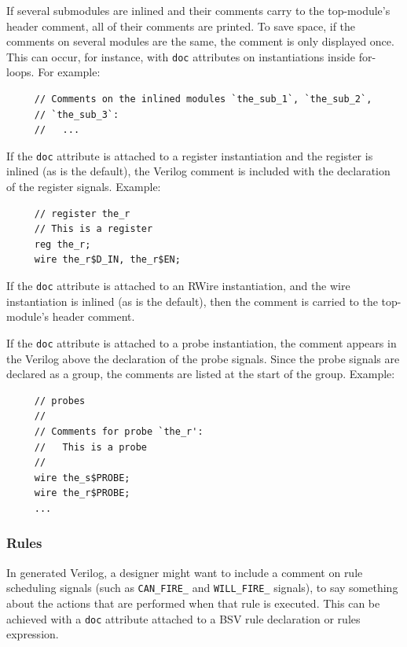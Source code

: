\documentclass[twoside,letterpaper]{article}
\newcommand{\te}[1]{\texttt{#1}}
\begin{document}
If several submodules are inlined and their comments
carry to the top-module's header comment, all of their comments are
printed.  To save space, if the comments on several modules are the same,
the comment is only displayed once.  This can occur, for instance, with
\te{doc} attributes on instantiations inside for-loops.  For example:
\begin{verbatim}
     // Comments on the inlined modules `the_sub_1`, `the_sub_2`,
     // `the_sub_3`:
     //   ...
\end{verbatim}
If the \te{doc} attribute is attached to a register instantiation and
the register is inlined (as is the default), the
Verilog comment is included with the declaration of the register signals.  Example: 
\begin{verbatim}
     // register the_r
     // This is a register
     reg the_r;
     wire the_r$D_IN, the_r$EN;
\end{verbatim}
If the \te{doc} attribute is attached to an RWire instantiation, and
the wire instantiation is inlined (as is the default), then the comment
is carried to the top-module's header comment.

If the \te{doc} attribute is attached to a probe instantiation, the comment
appears in the Verilog above the declaration of the probe signals.  Since
the probe signals are declared as a group, the comments are listed at
the start of the group. Example:
\begin{verbatim}
     // probes
     //
     // Comments for probe `the_r':
     //   This is a probe
     //
     wire the_s$PROBE;
     wire the_r$PROBE;
     ...
\end{verbatim}


\subsubsection{Rules}
\label{comments-rules}

In generated Verilog, a designer might want to include a comment on
rule scheduling signals (such as \te{CAN\_FIRE\_} and \te{WILL\_FIRE\_} signals), to say something about the actions that are performed when that rule
is executed.  This can be achieved with a \te{doc} attribute attached
to a BSV rule declaration or rules expression.
\end{document}
